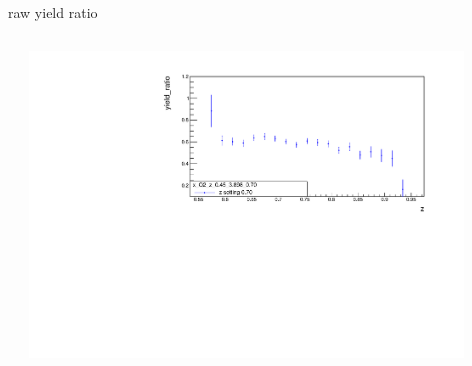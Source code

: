 \begin{frame}{raw yield ratio}
\begin{columns}
\begin{column}[T]{0.5\textwidth}
\end{column}
\begin{column}[T]{0.5\textwidth}
\includegraphics[width = 0.9\textwidth]{results/yield/statistics/x_Q2_z_0.45_3.898_0.70_ratio.pdf}
\end{column}
\end{columns}
\end{frame}
